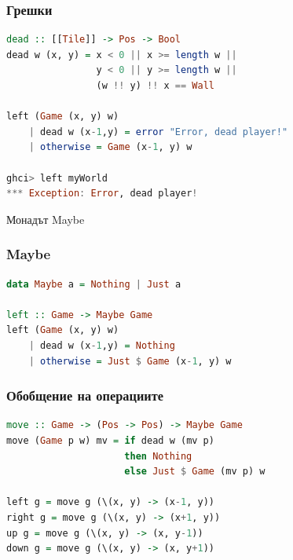 \documentclass{beamer}
\begin{document}
\begin{frame}[fragile]
  \frametitle{Грешки}

\begin{lstlisting}[language=Haskell]
dead :: [[Tile]] -> Pos -> Bool
dead w (x, y) = x < 0 || x >= length w ||
                y < 0 || y >= length w || 
                (w !! y) !! x == Wall

left (Game (x, y) w) 
    | dead w (x-1,y) = error "Error, dead player!"
    | otherwise = Game (x-1, y) w

ghci> left myWorld 
*** Exception: Error, dead player!
\end{lstlisting}



\end{frame}

\begin{frame}
  \centerline{Монадът Maybe}
\end{frame}


\begin{frame}[fragile]
  \frametitle{Maybe}

\begin{lstlisting}[language=Haskell]
data Maybe a = Nothing | Just a

left :: Game -> Maybe Game
left (Game (x, y) w) 
    | dead w (x-1,y) = Nothing
    | otherwise = Just $ Game (x-1, y) w

\end{lstlisting}

\end{frame}


\begin{frame}[fragile]
  \frametitle{Обобщение на операциите}

\begin{lstlisting}[language=Haskell]
move :: Game -> (Pos -> Pos) -> Maybe Game
move (Game p w) mv = if dead w (mv p) 
                     then Nothing 
                     else Just $ Game (mv p) w

left g = move g (\(x, y) -> (x-1, y))
right g = move g (\(x, y) -> (x+1, y))
up g = move g (\(x, y) -> (x, y-1))
down g = move g (\(x, y) -> (x, y+1))
\end{lstlisting}

\end{frame}
\end{document}
